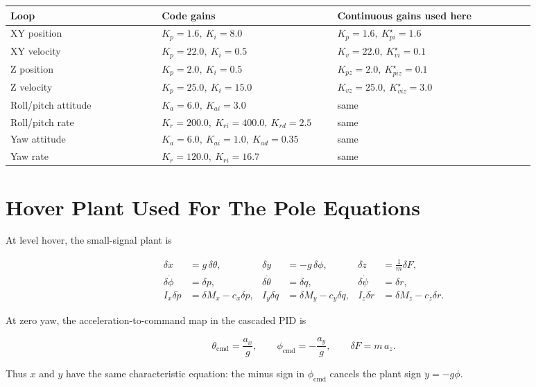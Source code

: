 \documentclass[11pt]{article}
\begin{document}
\begin{longtable}{>{\raggedright\arraybackslash}p{0.26\linewidth}
                  >{\raggedright\arraybackslash}p{0.28\linewidth}
                  >{\raggedright\arraybackslash}p{0.34\linewidth}}
\toprule
Loop & Code gains & Continuous gains used here \\
\midrule
XY position & \(K_p=1.6,\ K_i=8.0\) & \(K_p=1.6,\ K_{pi}^{\star}=1.6\) \\
XY velocity & \(K_p=22.0,\ K_i=0.5\) & \(K_v=22.0,\ K_{vi}^{\star}=0.1\) \\
Z position & \(K_p=2.0,\ K_i=0.5\) & \(K_{pz}=2.0,\ K_{piz}^{\star}=0.1\) \\
Z velocity & \(K_p=25.0,\ K_i=15.0\) & \(K_{vz}=25.0,\ K_{viz}^{\star}=3.0\) \\
Roll/pitch attitude & \(K_a=6.0,\ K_{ai}=3.0\) & same \\
Roll/pitch rate & \(K_r=200.0,\ K_{ri}=400.0,\ K_{rd}=2.5\) & same \\
Yaw attitude & \(K_a=6.0,\ K_{ai}=1.0,\ K_{ad}=0.35\) & same \\
Yaw rate & \(K_r=120.0,\ K_{ri}=16.7\) & same \\
\bottomrule
\end{longtable}

\section{Hover Plant Used For The Pole Equations}

At level hover, the small-signal plant is

\[
\begin{aligned}
\delta \ddot{x} &= g\,\delta\theta, &
\delta \ddot{y} &= -g\,\delta\phi, &
\delta \ddot{z} &= \frac{1}{m}\delta F,\\
\delta\dot{\phi} &= \delta p, &
\delta\dot{\theta} &= \delta q, &
\delta\dot{\psi} &= \delta r,\\
I_x\delta\dot{p} &= \delta M_x-c_x\delta p, &
I_y\delta\dot{q} &= \delta M_y-c_y\delta q, &
I_z\delta\dot{r} &= \delta M_z-c_z\delta r.
\end{aligned}
\]

At zero yaw, the acceleration-to-command map in the cascaded PID is

\[
\theta_{\mathrm{cmd}}=\frac{a_x}{g},
\qquad
\phi_{\mathrm{cmd}}=-\frac{a_y}{g},
\qquad
\delta F=m\,a_z.
\]

Thus \(x\) and \(y\) have the same characteristic equation: the minus sign in
\(\phi_{\mathrm{cmd}}\) cancels the plant sign \(\ddot{y}=-g\phi\).
\end{document}
